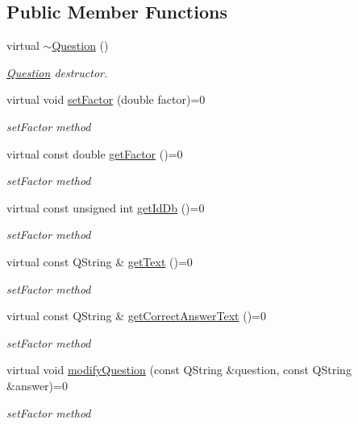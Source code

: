 \subsection*{Public Member Functions}
\begin{DoxyCompactItemize}
\item 
virtual \hyperlink{class_question_a0841b4ac227eb40d2d2f0d3449ca12d1}{$\sim$\+Question} ()
\begin{DoxyCompactList}\small\item\em \hyperlink{class_question}{Question} destructor. \end{DoxyCompactList}\item 
virtual void \hyperlink{class_question_ad5c8dfa4de5cce04fad3e31c0ccee1a0}{set\+Factor} (double factor)=0
\begin{DoxyCompactList}\small\item\em set\+Factor method \end{DoxyCompactList}\item 
virtual const double \hyperlink{class_question_a31d98a74f4e54916d11bc2817b5518a4}{get\+Factor} ()=0
\begin{DoxyCompactList}\small\item\em set\+Factor method \end{DoxyCompactList}\item 
virtual const unsigned int \hyperlink{class_question_a5253480b740d35dfb7fe1331d74457b3}{get\+Id\+Db} ()=0
\begin{DoxyCompactList}\small\item\em set\+Factor method \end{DoxyCompactList}\item 
virtual const Q\+String \& \hyperlink{class_question_a23e84af04f16e0dee933844d5c46b370}{get\+Text} ()=0
\begin{DoxyCompactList}\small\item\em set\+Factor method \end{DoxyCompactList}\item 
virtual const Q\+String \& \hyperlink{class_question_a3c825d4c813d2d620c46b062aef1c364}{get\+Correct\+Answer\+Text} ()=0
\begin{DoxyCompactList}\small\item\em set\+Factor method \end{DoxyCompactList}\item 
virtual void \hyperlink{class_question_ae3724056374e2e9160f4d7250241f9ab}{modify\+Question} (const Q\+String \&question, const Q\+String \&answer)=0
\begin{DoxyCompactList}\small\item\em set\+Factor method \end{DoxyCompactList}\end{DoxyCompactItemize}


